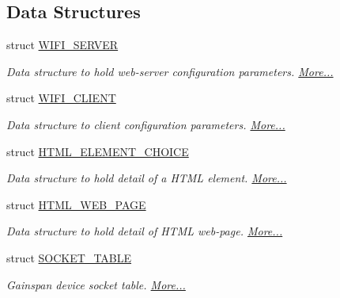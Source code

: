 \subsection*{Data Structures}
\begin{DoxyCompactItemize}
\item 
struct \hyperlink{group__wireless__interface_struct_w_i_f_i___s_e_r_v_e_r}{W\+I\+F\+I\+\_\+\+S\+E\+R\+V\+ER}
\begin{DoxyCompactList}\small\item\em Data structure to hold web-\/server configuration parameters.  \hyperlink{group__wireless__interface_struct_w_i_f_i___s_e_r_v_e_r}{More...}\end{DoxyCompactList}\item 
struct \hyperlink{group__wireless__interface_struct_w_i_f_i___c_l_i_e_n_t}{W\+I\+F\+I\+\_\+\+C\+L\+I\+E\+NT}
\begin{DoxyCompactList}\small\item\em Data structure to client configuration parameters.  \hyperlink{group__wireless__interface_struct_w_i_f_i___c_l_i_e_n_t}{More...}\end{DoxyCompactList}\item 
struct \hyperlink{group__wireless__interface_struct_h_t_m_l___e_l_e_m_e_n_t___c_h_o_i_c_e}{H\+T\+M\+L\+\_\+\+E\+L\+E\+M\+E\+N\+T\+\_\+\+C\+H\+O\+I\+CE}
\begin{DoxyCompactList}\small\item\em Data structure to hold detail of a H\+T\+ML element.  \hyperlink{group__wireless__interface_struct_h_t_m_l___e_l_e_m_e_n_t___c_h_o_i_c_e}{More...}\end{DoxyCompactList}\item 
struct \hyperlink{group__wireless__interface_struct_h_t_m_l___w_e_b___p_a_g_e}{H\+T\+M\+L\+\_\+\+W\+E\+B\+\_\+\+P\+A\+GE}
\begin{DoxyCompactList}\small\item\em Data structure to hold detail of H\+T\+ML web-\/page.  \hyperlink{group__wireless__interface_struct_h_t_m_l___w_e_b___p_a_g_e}{More...}\end{DoxyCompactList}\item 
struct \hyperlink{group__wireless__interface_struct_s_o_c_k_e_t___t_a_b_l_e}{S\+O\+C\+K\+E\+T\+\_\+\+T\+A\+B\+LE}
\begin{DoxyCompactList}\small\item\em Gainspan device socket table.  \hyperlink{group__wireless__interface_struct_s_o_c_k_e_t___t_a_b_l_e}{More...}\end{DoxyCompactList}\item 

\end{DoxyCompactItemize}
